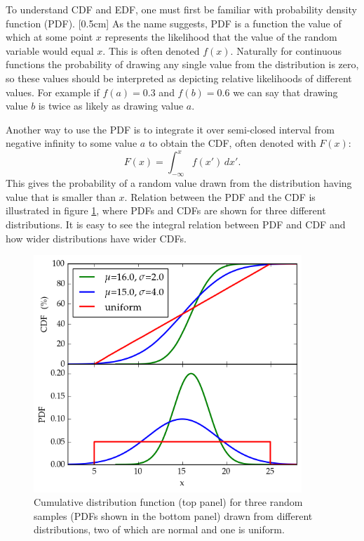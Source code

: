 \documentclass[english, oneside]{HYgradu}
\begin{document}
To understand CDF and EDF, one must first be familiar with probability density function (PDF).
\reversemarginpar
{}[0.5cm]
As the name suggests, PDF is a function the value of which at some point $x$ represents the likelihood that the value of the random variable would equal $x$. This is often denoted $f(x)$. Naturally for continuous functions the probability of drawing any single value from the distribution is zero, so these values should be interpreted as depicting relative likelihoods of different values. For example if $f(a)=0.3$ and $f(b)=0.6$ we can say that drawing value $b$ is twice as likely as drawing value $a$. \citep{htk}

Another way to use the PDF is to integrate it over semi-closed interval from negative infinity to some value $a$ to obtain the CDF, often denoted with $F(x)$:
\begin{equation}
	F(x) = \int_{-\infty}^x f(x') \,dx'.
\end{equation}	
This gives the probability of a random value drawn from the distribution having value that is smaller than $x$. Relation between the PDF and the CDF is illustrated in figure \ref{fig:cdf}, where PDFs and CDFs are shown for three different distributions. It is easy to see the integral relation between PDF and CDF and how wider distributions have wider CDFs. \citep{htk}

\begin{figure}
   \reversemarginpar
   \centering
   \includegraphics[width=0.9\textwidth]{kuvat/cdf.png}
   \caption{Cumulative distribution function (top panel) for three random samples (PDFs shown in the bottom panel) drawn from different distributions, two of which are normal and one is uniform.}
   \label{fig:cdf}

\end{figure}
\end{document}
